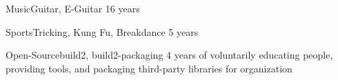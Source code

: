 \documentclass[a4paper,10pt]{cv}
\begin{document}
  \bigskip
    \vspace{-1em}
    \begin{multicols}{2}
      \begin{cvTimeItem}{Music}{Guitar, E-Guitar}
        16 years
      \end{cvTimeItem}
      \begin{cvTimeItem}{Sports}{Tricking, Kung Fu, Breakdance}
        5 years
      \end{cvTimeItem}
      \begin{cvTimeItem}{Open-Source}{build2, build2-packaging}
          4 years of voluntarily educating people, providing tools, and packaging third-party libraries for  organization
      \end{cvTimeItem}

\end{multicols}
\end{document}
